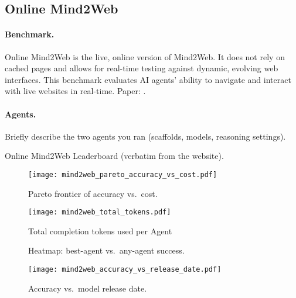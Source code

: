 \subsection{Online Mind2Web}\label{app:mind2web}

\paragraph{Benchmark.}
Online Mind2Web is the live, online version of Mind2Web. It does not rely on cached pages and allows for real-time testing against dynamic, evolving web interfaces. This benchmark evaluates AI agents' ability to navigate and interact with live websites in real-time.
Paper: \cite{mind2web}.

\paragraph{Agents.}
Briefly describe the two agents you ran (scaffolds, models, reasoning settings).


\begin{table}[t]
  \centering
  \caption{Online Mind2Web Leaderboard (verbatim from the website).}
  \label{tab:mind2web_full}
  
\end{table}


\begin{figure}[htbp]
  \centering
  \texttt{[image: mind2web\_pareto\_accuracy\_vs\_cost.pdf]}
  \caption{Pareto frontier of accuracy vs.\ cost.}
  \label{fig:mind2web_pareto}
\end{figure}

\begin{figure}[htbp]
  \centering
  \texttt{[image: mind2web\_total\_tokens.pdf]}
  \caption{Total completion tokens used per Agent}
  \label{fig:mind2web_tokens}
\end{figure}

\begin{figure*}[t]
  \centering
  \caption{Heatmap: best-agent vs.\ any-agent success.}
  \label{fig:mind2web_heatmap}
\end{figure*}

\begin{figure}[htbp]
  \centering
  \texttt{[image: mind2web\_accuracy\_vs\_release\_date.pdf]}
  \caption{Accuracy vs.\ model release date.}
  \label{fig:mind2web_release}
\end{figure}

\clearpage
